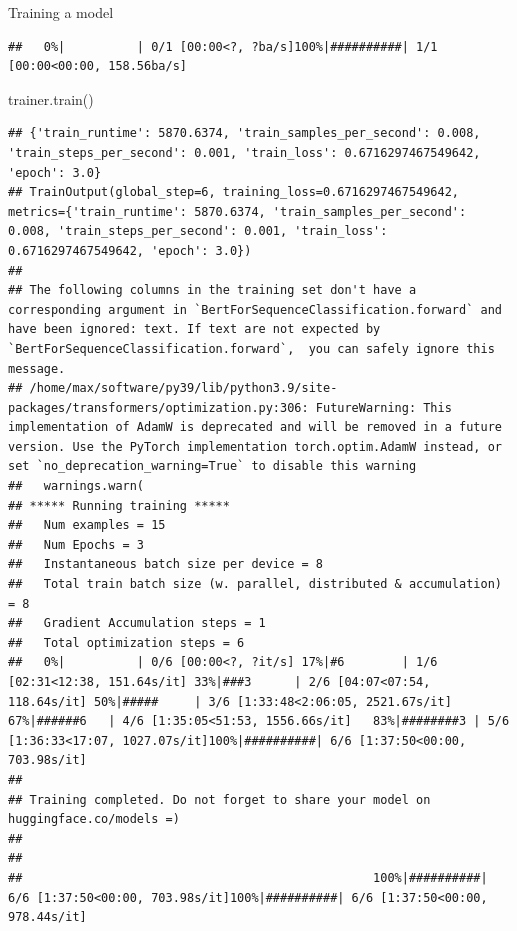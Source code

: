 \documentclass[
  10pt,
  ignorenonframetext,
  aspectratio=169]{beamer}
\newenvironment{Shaded}{\begin{snugshade}}{\end{snugshade}}
\newcommand{\NormalTok}[1]{\textcolor[rgb]{0.80,0.80,0.80}{#1}}
\begin{document}
\begin{frame}[fragile]{Training a model}
\begin{verbatim}
##   0%|          | 0/1 [00:00<?, ?ba/s]100%|##########| 1/1 [00:00<00:00, 158.56ba/s]
\end{verbatim}

\begin{Shaded}
\begin{Highlighting}[]
\NormalTok{trainer.train()}
\end{Highlighting}
\end{Shaded}

\begin{verbatim}
## {'train_runtime': 5870.6374, 'train_samples_per_second': 0.008, 'train_steps_per_second': 0.001, 'train_loss': 0.6716297467549642, 'epoch': 3.0}
## TrainOutput(global_step=6, training_loss=0.6716297467549642, metrics={'train_runtime': 5870.6374, 'train_samples_per_second': 0.008, 'train_steps_per_second': 0.001, 'train_loss': 0.6716297467549642, 'epoch': 3.0})
## 
## The following columns in the training set don't have a corresponding argument in `BertForSequenceClassification.forward` and have been ignored: text. If text are not expected by `BertForSequenceClassification.forward`,  you can safely ignore this message.
## /home/max/software/py39/lib/python3.9/site-packages/transformers/optimization.py:306: FutureWarning: This implementation of AdamW is deprecated and will be removed in a future version. Use the PyTorch implementation torch.optim.AdamW instead, or set `no_deprecation_warning=True` to disable this warning
##   warnings.warn(
## ***** Running training *****
##   Num examples = 15
##   Num Epochs = 3
##   Instantaneous batch size per device = 8
##   Total train batch size (w. parallel, distributed & accumulation) = 8
##   Gradient Accumulation steps = 1
##   Total optimization steps = 6
##   0%|          | 0/6 [00:00<?, ?it/s] 17%|#6        | 1/6 [02:31<12:38, 151.64s/it] 33%|###3      | 2/6 [04:07<07:54, 118.64s/it] 50%|#####     | 3/6 [1:33:48<2:06:05, 2521.67s/it] 67%|######6   | 4/6 [1:35:05<51:53, 1556.66s/it]   83%|########3 | 5/6 [1:36:33<17:07, 1027.07s/it]100%|##########| 6/6 [1:37:50<00:00, 703.98s/it] 
## 
## Training completed. Do not forget to share your model on huggingface.co/models =)
## 
## 
##                                                 100%|##########| 6/6 [1:37:50<00:00, 703.98s/it]100%|##########| 6/6 [1:37:50<00:00, 978.44s/it]
\end{verbatim}
\end{frame}
\end{document}
